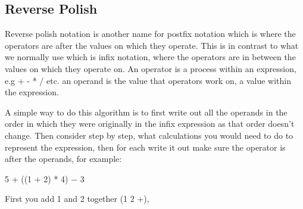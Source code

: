 \subsection{Reverse Polish}
  \noindent
   Reverse polish notation is another name for postfix notation which is where the operators are after the values on which they operate. This is in contrast to what we normally use which is infix notation, where the operators are in between the values on which they operate on. An operator is a process within an expression, e.g + - * / etc. an operand is the value that operators work on, a value within the expression. 
  
  A simple way to do this algorithm is to first write out all the operands in the order in which they were originally in the infix expression as that order doesn't change. Then consider step by step, what calculations you would need to do to represent the expression, then for each write it out make sure the operator is after the operands, for example:

5 + ((1 + 2) * 4) − 3

First you add 1 and 2 together (1 2 +), 

